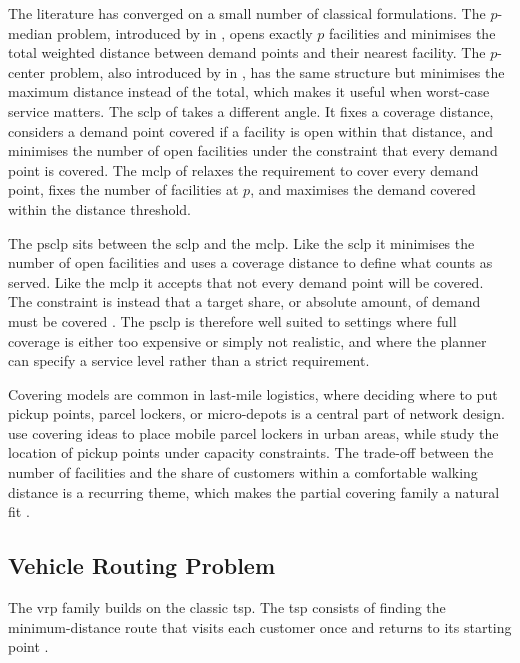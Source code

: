 \documentclass[12pt]{article}
\begin{document}
The literature has converged on a small number of classical formulations. The \(p\)-median problem, introduced by \citeauthor{hakimi1964optimum} in \citeyear{hakimi1964optimum}, opens exactly \(p\) facilities and minimises the total weighted distance between demand points and their nearest facility. The \(p\)-center problem, also introduced by \citeauthor{hakimi1965optimum} in \citeyear{hakimi1965optimum}, has the same structure but minimises the maximum distance instead of the total, which makes it useful when worst-case service matters. The \ac{sclp} of \textcite{toregas1971location} takes a different angle. It fixes a coverage distance, considers a demand point covered if a facility is open within that distance, and minimises the number of open facilities under the constraint that every demand point is covered. The \ac{mclp} of \textcite{church1974maximal} relaxes the requirement to cover every demand point, fixes the number of facilities at \(p\), and maximises the demand covered within the distance threshold.

The \ac{psclp} sits between the \ac{sclp} and the \ac{mclp}. Like the \ac{sclp} it minimises the number of open facilities and uses a coverage distance to define what counts as served. Like the \ac{mclp} it accepts that not every demand point will be covered. The constraint is instead that a target share, or absolute amount, of demand must be covered \parencite{psclp}. The \ac{psclp} is therefore well suited to settings where full coverage is either too expensive or simply not realistic, and where the planner can specify a service level rather than a strict requirement.

Covering models are common in last-mile logistics, where deciding where to put pickup points, parcel lockers, or micro-depots is a central part of network design. \textcite{schwerdfeger2020optimizing} use covering ideas to place mobile parcel lockers in urban areas, while \textcite{deutsch2018parcel} study the location of pickup points under capacity constraints. The trade-off between the number of facilities and the share of customers within a comfortable walking distance is a recurring theme, which makes the partial covering family a natural fit \parencite{boyer2009last}.

\subsection{Vehicle Routing Problem}
\label{subsec:vehicle-routing-problem}

The \acf{vrp} family builds on the classic \acf{tsp}. The \ac{tsp} consists of finding the minimum-distance route that visits each customer once and returns to its starting point \parencite{tps}.
\end{document}
